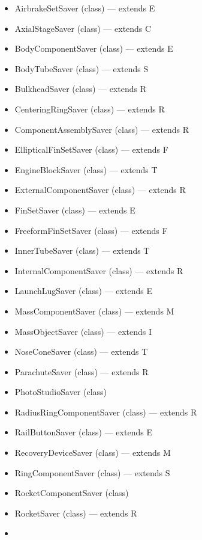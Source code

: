 \documentclass{amsdtx}
\begin{document}
\begin{itemize}
\begin{itemize}
    \begin{itemize}
    
    \item
      AirbrakeSetSaver (class) --- extends E
    \item
      AxialStageSaver (class) --- extends C
    \item
      BodyComponentSaver (class) --- extends E
    \item
      BodyTubeSaver (class) --- extends S
    \item
      BulkheadSaver (class) --- extends R
    \item
      CenteringRingSaver (class) --- extends R
    \item
      ComponentAssemblySaver (class) --- extends R
    \item
      EllipticalFinSetSaver (class) --- extends F
    \item
      EngineBlockSaver (class) --- extends T
    \item
      ExternalComponentSaver (class) --- extends R
    \item
      FinSetSaver (class) --- extends E
    \item
      FreeformFinSetSaver (class) --- extends F
    \item
      InnerTubeSaver (class) --- extends T
    \item
      InternalComponentSaver (class) --- extends R
    \item
      LaunchLugSaver (class) --- extends E
    \item
      MassComponentSaver (class) --- extends M
    \item
      MassObjectSaver (class) --- extends I
    \item
      NoseConeSaver (class) --- extends T
    \item
      ParachuteSaver (class) --- extends R
    \item
      PhotoStudioSaver (class)
    \item
      RadiusRingComponentSaver (class) --- extends R
    \item
      RailButtonSaver (class) --- extends E
    \item
      RecoveryDeviceSaver (class) --- extends M
    \item
      RingComponentSaver (class) --- extends S
    \item
      RocketComponentSaver (class)
    \item
      RocketSaver (class) --- extends R
    \item

\end{itemize}
\end{itemize}
\end{itemize}
\end{document}
